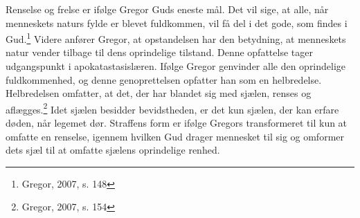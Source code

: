 Renselse og frelse er ifølge Gregor Guds eneste mål. Det vil sige, at alle, når menneskets naturs fylde er blevet fuldkommen, vil få del i det gode, som findes i Gud.\footnote{Gregor, 2007, s. 148} Videre anfører Gregor, at opstandelsen har den betydning, at menneskets natur vender tilbage til dens oprindelige tilstand. Denne opfattelse tager udgangspunkt i apokatastasislæren. Ifølge Gregor genvinder alle den oprindelige fuldkommenhed, og denne genoprettelsen opfatter han som en helbredelse. Helbredelsen omfatter, at det, der har blandet sig med sjælen, renses og aflægges.\footnote{Gregor, 2007, s. 154} Idet sjælen besidder bevidstheden, er det kun sjælen, der kan erfare døden, når legemet dør. Straffens form er ifølge Gregors transformeret til kun at omfatte en renselse, igennem hvilken Gud drager mennesket til sig og omformer dets sjæl til at omfatte sjælens oprindelige renhed.